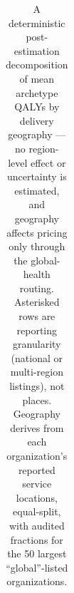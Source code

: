 \documentclass[
  11pt,
  letterpaper,
  DIV=11,
  numbers=noendperiod]{scrartcl}
\begin{document}
{

\begin{longtable}[]{@{}
  >{\raggedright\arraybackslash}p{}
  >{\raggedright\arraybackslash}p{}
  >{\raggedright\arraybackslash}p{}
  >{\raggedleft\arraybackslash}p{}
  >{\raggedright\arraybackslash}p{}
  >{\raggedright\arraybackslash}p{}@{}}

\caption{\label{tbl-geo}A deterministic post-estimation decomposition of
mean archetype QALYs by delivery geography --- no region-level effect or
uncertainty is estimated, and geography affects pricing only through the
global-health routing. Asterisked rows are reporting granularity
(national or multi-region listings), not places. Geography derives from
each organization's reported service locations, equal-split, with
audited fractions for the 50 largest ``global''-listed organizations.}

\tabularnewline


\end{longtable}}
\end{document}
